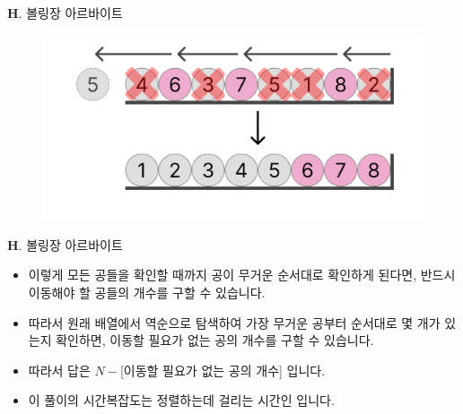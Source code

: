 \begin{frame}{\textbf{H}. 볼링장 아르바이트}	
	\begin{figure}[h!]
		\centering
		\includegraphics[width=0.9\linewidth]{../images/bowling-part-time/1.png}
	\end{figure}
\end{frame}

\begin{frame}{\textbf{H}. 볼링장 아르바이트}
	\begin{itemize}
		\item 이렇게 모든 공들을 확인할 때까지 공이 무거운 순서대로 확인하게 된다면, 반드시 이동해야 할 공들의 개수를 구할 수 있습니다.
		\item 따라서 원래 배열에서 역순으로 탐색하여 가장 무거운 공부터 순서대로 몇 개가 있는지 확인하면, 이동할 필요가 없는 공의 개수를 구할 수 있습니다.
		\item 따라서 답은 $N - $[이동할 필요가 없는 공의 개수] 입니다.
		\item 이 풀이의 시간복잡도는 정렬하는데 걸리는 시간인  입니다.
	\end{itemize}
\end{frame}
